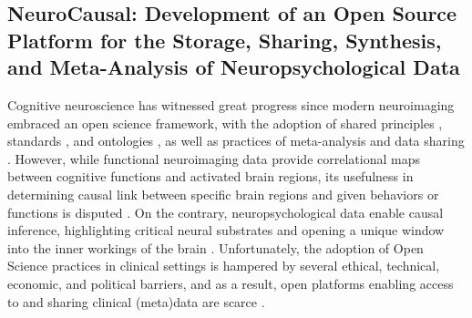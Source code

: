 \documentclass[../main.tex]{subfiles}
\begin{document}
\subsection{NeuroCausal: Development of an Open Source Platform for the Storage, Sharing, Synthesis, and Meta-Analysis of Neuropsychological Data} 

%

Cognitive neuroscience has witnessed great progress since modern neuroimaging embraced an open science framework, with the adoption of shared principles \parencite{Wilkinson2016}, standards \parencite{Gorgolewski2016}, and ontologies \parencite{poldrack_cognitive_2011}, as well as practices of meta-analysis\parencite{dockes_neuroquery_2020, yarkoni_large-scale_2011} and data sharing \parencite{gorgolewski2015}. However, while functional neuroimaging data provide correlational maps between cognitive functions and activated brain regions, its usefulness in determining causal link between specific brain regions and given behaviors or functions is disputed \parencite{weber_functional_2010, siddiqi_causal_2022}. On the contrary, neuropsychological data enable causal inference, highlighting critical neural substrates and opening a unique window into the inner workings of the brain \parencite{price_evolution_2018}. Unfortunately, the adoption of Open Science practices in clinical settings is hampered by several ethical, technical, economic, and political barriers, and as a result, open platforms enabling access to and sharing clinical (meta)data are scarce \parencite{lariviere_enigma_2021}.
\end{document}
